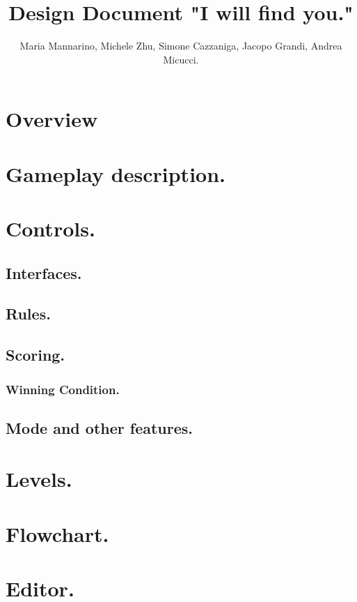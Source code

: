 \documentclass[a4]{report}
\begin{document}
	\author{Maria Mannarino, Michele Zhu, Simone Cazzaniga, Jacopo Grandi,
	 Andrea Micucci.}
	\title{Design Document "I will find you."}
	
	\maketitle
	
	\tableofcontents
	
	\chapter{Overview}
	
	
	\chapter{Gameplay description.}
	
	\chapter{Controls.}
	\section{Interfaces.}
	\section{Rules.}
	\section{Scoring.}
	\subsection{Winning Condition.}
	
	\section{Mode and other features.}
	
	\chapter{Levels.}
	
	\chapter{Flowchart.}
	
	\chapter{Editor.}
	
\end{document}
